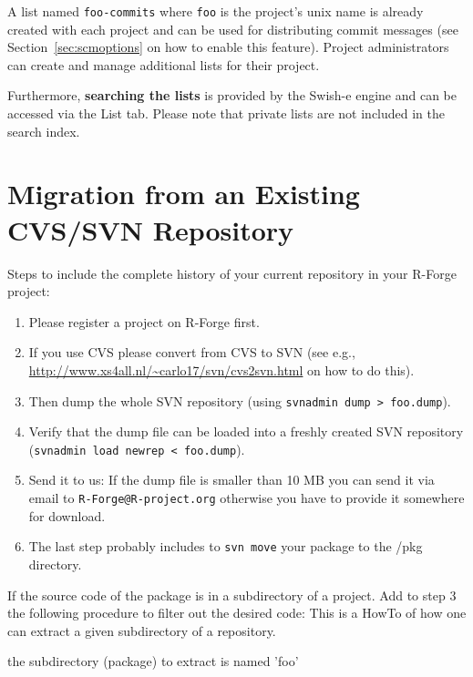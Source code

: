 \documentclass[a4paper]{article}
\let\code=\texttt
\let\email=\texttt
\begin{document}
A list named \texttt{foo-commits} where \texttt{foo} is the
project's unix name is already created with each project and can be
used for distributing commit messages (see
Section~\ref{sec:scmoptions}  on how to enable
this feature). Project administrators can create and manage additional
lists for their project.  

Furthermore, \textbf{searching the lists} is provided by the Swish-e engine
and can be accessed via the List tab. Please note that private lists
are not included in the search index.  


\section{Migration from an Existing CVS/SVN Repository}
\label{sec:svnmigration}

Steps to include the complete history of your current repository in
your R-Forge project:
\begin{enumerate}
\item Please register a project on R-Forge first.
\item If you use CVS please convert from CVS to SVN (see e.g.,
  \url{http://www.xs4all.nl/~carlo17/svn/cvs2svn.html} on how to do
  this).
\item Then dump the whole SVN repository (using \code{svnadmin dump >
    foo.dump}).
\item Verify that the dump file can be loaded into a freshly created
  SVN repository (\code{svnadmin load newrep < foo.dump}). 
\item Send it to us: If the dump file is smaller than 10 MB you can
  send it via email to \email{R-Forge@R-project.org} otherwise you have to
  provide it somewhere for download. 
\item The last step probably includes to \code{svn move} your package
  to the /pkg directory.
\end{enumerate}


If the source code of the package is in a subdirectory of a
project. Add to step 3 the following procedure to filter out the
desired code:
This is a HowTo of how one can extract a given subdirectory of a
repository.

the subdirectory (package) to extract is named 'foo'
\end{document}

